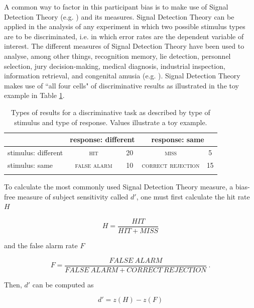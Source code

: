 A common way to factor in this participant bias is to make use of Signal Detection Theory (e.g. \cite{Macmillan1993,Macmillan2005}) and its measures. Signal Detection Theory can be applied in the analysis of any experiment in which two possible stimulus types are to be discriminated, i.e. in which error rates are the dependent variable of interest. The different measures of Signal Detection Theory have been used to analyse, among other things, recognition memory, lie detection, personnel selection, jury decision-making, medical diagnosis, industrial inspection, information retrieval, and congenital amusia (e.g. \cite{Stanislaw1999, Pfeifer2018}). Signal Detection Theory makes use of ``all four cells" of discriminative results as illustrated in the toy example in Table \ref{tab:6.9}.

\begin{table}\fontsize{10}{11}
\caption{Types of results for a discriminative task as described by type of stimulus and type of response. Values illustrate a toy example.}
\label{tab:6.9}
\centering
\begin{tabular}{lcccc}
\lsptoprule
\textbf{~}          & \multicolumn{2}{c}{response: different} & \multicolumn{2}{c}{response: same}  \\
\midrule
stimulus: different & \textsc{hit}         & 20                        & \textsc{miss}              & 5               \\
stimulus: same      & \textsc{false alarm} & 10                        & \textsc{correct rejection} & 15              \\
\lspbottomrule
\end{tabular}
\end{table}

To calculate the most commonly used Signal Detection Theory measure, a bias-free measure of subject sensitivity called $d'$, one must first calculate the hit rate $H$

\begin{equation}
\label{eq:H}
    H=\frac{HIT}{HIT+MISS}
\end{equation}

and the false alarm rate $F$

\begin{equation}
\label{eq:F}
    F=\frac{FALSE\ ALARM}{FALSE\ ALARM + CORRECT\ REJECTION}\ .
\end{equation}

Then, $d'$ can be computed as

\begin{equation}
\label{eq:dprime}
    d'=z(H)-z(F)
\end{equation}

